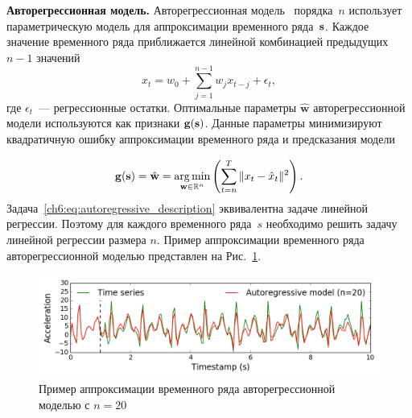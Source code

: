 \textbf{Авторегрессионная модель.}
Авторегрессионная модель~\cite{lukashin2003adaptive} порядка~$n$
использует параметрическую модель для аппроксимации временного ряда~$\mathbf{s}$. 
Каждое значение временного ряда приближается линейной комбинацией предыдущих $n-1$ значений
\begin{equation*}
	x_t = w_0 + \sum_{j=1}^{n-1} w_j x_{t-j} + \epsilon_t,
\end{equation*}
где $\epsilon_t$~--- регрессионные остатки.
Оптимальные параметры $\hat{\mathbf{w}}$ авторегрессионной модели используются как признаки $\mathbf{g}(\mathbf{s})$.
Данные параметры минимизируют квадратичную ошибку аппроксимации временного ряда и предсказания модели

\begin{equation}
	\mathbf{g}(\mathbf{s}) = \hat{\mathbf{w}} = \mathop{\arg \min}\limits_{\mathbf{w} \in \mathbb{R}^{n}} \left( \sum_{t=n}^{T} \|x_t - \hat{x}_t\|^2\right).
	\label{ch6:eq:autoregressive_description}
\end{equation}
Задача~\eqref{ch6:eq:autoregressive_description} эквивалентна задаче линейной регрессии.
Поэтому для каждого временного ряда~$s$ необходимо решить задачу линейной регрессии размера $n$.
Пример аппроксимации временного ряда авторегрессионной моделью представлен на Рис.~\ref{ch6:fig:ar_example}.

\begin{figure}[ht]
	\centering
	\includegraphics[width=1\linewidth]{figs/ch6/ar_example.png}
	\caption{Пример аппроксимации временного ряда авторегрессионной моделью с $n = 20$}
	\label{ch6:fig:ar_example}
\end{figure}

